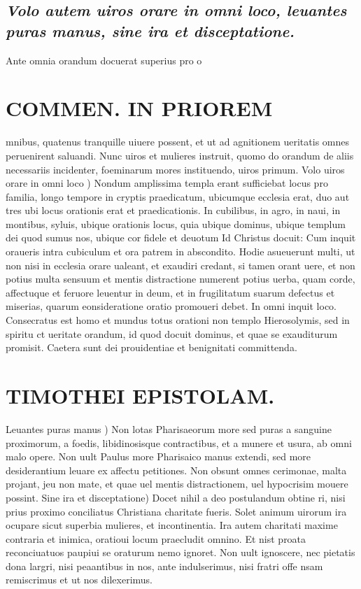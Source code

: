 \documentclass{article}
\begin{document}
\begin{pages}
\subsection*{\textit{Volo autem uiros orare in omni loco, leuantes puras manus, sine ira et disceptatione. }}\pstart Ante omnia orandum docuerat superius pro o\pend
\section*{COMMEN. IN PRIOREM }
\marginpar{[ p.55 ]}\pstart mnibus, quatenus tranquille uiuere possent, et ut ad agnitionem ueritatis omnes peruenirent saluandi. Nunc uiros et mulieres instruit, quomo do orandum de aliis necessariis incidenter, foeminarum mores instituendo, uiros primum.  \pend\pstart Volo uiros orare in omni loco ) Nondum amplissima templa erant sufficiebat locus pro familia, longo tempore in cryptis praedicatum, ubicumque ecclesia erat, duo aut tres ubi locus orationis erat et praedicationis. In cubilibus, in agro, in naui, in montibus, syluis, ubique orationis locus, quia ubique dominus, ubique  templum dei quod sumus nos, ubique cor fidele et deuotum Id Christus docuit: Cum inquit oraueris intra cubiculum et ora patrem in abscondito. Hodie asueuerunt multi, ut non nisi in ecclesia orare ualeant, et exaudiri credant, si tamen orant uere, et non potius multa sensuum et mentis distractione numerent potius uerba, quam corde, affectuque et feruore leuentur in deum, et in frugilitatum suarum defectus et miserias, quarum eonsideratione oratio promoueri debet. In omni inquit loco. Consecratus est homo et mundus totus orationi non templo Hierosolymis, sed in spiritu ct ueritate orandum, id quod docuit dominus, et quae se exauditurum promisit. Caetera sunt dei prouidentiae et benignitati committenda.  \pend
\section*{TIMOTHEI EPISTOLAM. }
\marginpar{[ p.56 ]}\pstart Leuantes puras manus ) Non lotas Pharisaeorum more sed puras a sanguine proximorum, a foedis, libidinosisque contractibus, et a munere et usura, ab omni malo opere. Non uult Paulus more Pharisaico manus extendi, sed more desiderantium leuare ex affectu petitiones. Non obsunt omnes cerimonae, malta projant, jeu non mate, et quae uel mentis distractionem, uel hypocrisim mouere possint.  \pend\pstart Sine ira et disceptatione) Docet nihil a deo postulandum obtine ri, nisi prius proximo conciliatus Christiana charitate fueris. Solet animum uirorum ira ocupare sicut superbia mulieres, et incontinentia. Ira autem charitati maxime contraria et inimica, oratioui locum praecludit omnino. Et nist proata reconciuatuos paupiui se oraturum nemo ignoret. Non uult ignoscere, nec pietatis dona largri, nisi peaantibus in nos, ante indulserimus, nisi fratri offe nsam remiscrimus et ut nos dilexerimus.  \pend
{}
{}

\end{pages}
\end{document}
